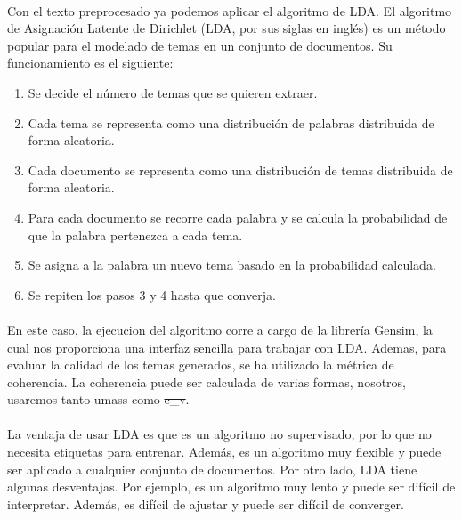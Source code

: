 \documentclass{report}
\begin{document}
{{                \paragraph*{}{
                    Con el texto preprocesado ya podemos aplicar el algoritmo de LDA.
                    El algoritmo de Asignación Latente de Dirichlet (LDA, por sus siglas en inglés) es un método popular para el modelado de temas en un conjunto de documentos.
                    Su funcionamiento es el siguiente:
                }
                \begin{enumerate}
                    \item Se decide el número de temas que se quieren extraer.
                    \item Cada tema se representa como una distribución de palabras distribuida de forma aleatoria.
                    \item Cada documento se representa como una distribución de temas distribuida de forma aleatoria.
                    \item Para cada documento se recorre cada palabra y se calcula la probabilidad de que la palabra pertenezca a cada tema.
                    \item Se asigna a la palabra un nuevo tema basado en la probabilidad calculada.
                    \item Se repiten los pasos 3 y 4 hasta que converja.
                \end{enumerate}
                \paragraph*{}{
                    En este caso, la ejecucion del algoritmo corre a cargo de la librería Gensim, la cual nos proporciona una interfaz sencilla para trabajar con LDA.
                    Ademas, para evaluar la calidad de los temas generados, se ha utilizado la métrica de coherencia. La coherencia puede ser calculada de varias formas, nosotros, usaremos tanto umass como \st{c\_v}.
                }
                \paragraph*{}{
                    La ventaja de usar LDA es que es un algoritmo no supervisado, por lo que no necesita etiquetas para entrenar. Además, es un algoritmo muy flexible y puede ser aplicado a cualquier conjunto de documentos.
                    Por otro lado, LDA tiene algunas desventajas. Por ejemplo, es un algoritmo muy lento y puede ser difícil de interpretar. Además, es difícil de ajustar y puede ser difícil de converger.
                }
}}
\end{document}
